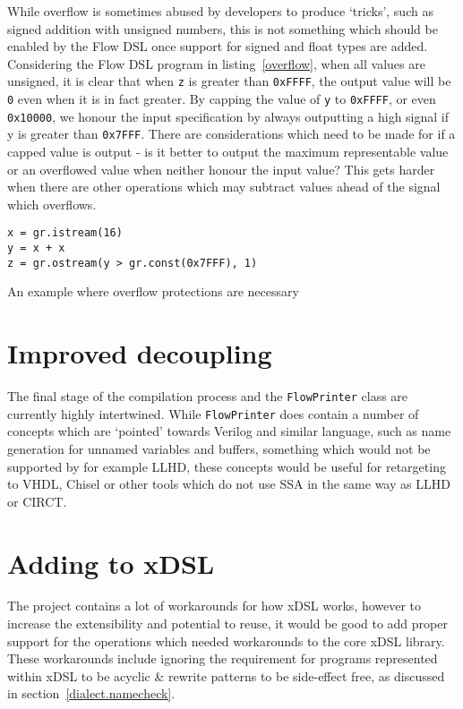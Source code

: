 While overflow is sometimes abused by developers to produce `tricks', such as signed addition with unsigned numbers, this is not something which should be enabled by the Flow DSL once support for signed and float types are added. Considering the Flow DSL program in listing \ref{overflow}, when all values are unsigned, it is clear that when \lstinline|z| is greater than \lstinline|0xFFFF|, the output value will be \lstinline|0| even when it is in fact greater. By capping the value of \lstinline|y| to \lstinline|0xFFFF|, or even \lstinline|0x10000|, we honour the input specification by always outputting a high signal if y is greater than \lstinline|0x7FFF|. There are considerations which need to be made for if a capped value is output \hyphen{} is it better to output the maximum representable value or an overflowed value when neither honour the input value? This gets harder when there are other operations which may subtract values ahead of the signal which overflows.

\makeatletter
{}
\def\dontdofcolorbox{\renewcommand\fcolorbox[4][]{##4}}
\makeatother
\begin{listing}[H]
  \begin{verbatim}
x = gr.istream(16)
y = x + x
z = gr.ostream(y > gr.const(0x7FFF), 1)
  \end{verbatim}
  \cprotect\caption{An example where overflow protections are necessary}\label{overflow}
\end{listing}


\section{Improved decoupling}
The final stage of the compilation process and the \lstinline|FlowPrinter| class are currently highly intertwined. While \lstinline|FlowPrinter| does contain a number of concepts which are `pointed' towards Verilog and similar language, such as name generation for unnamed variables and buffers, something which would not be supported by for example LLHD, these concepts would be useful for retargeting to VHDL, Chisel or other tools which do not use SSA in the same way as LLHD or CIRCT.

\section{Adding to xDSL}
The project contains a lot of workarounds for how xDSL works, however to increase the extensibility and potential to reuse, it would be good to add proper support for the operations which needed workarounds to the core xDSL library. These workarounds include ignoring the requirement for programs represented within xDSL to be acyclic \& rewrite patterns to be side-effect free, as discussed in section \ref{dialect.namecheck}.

